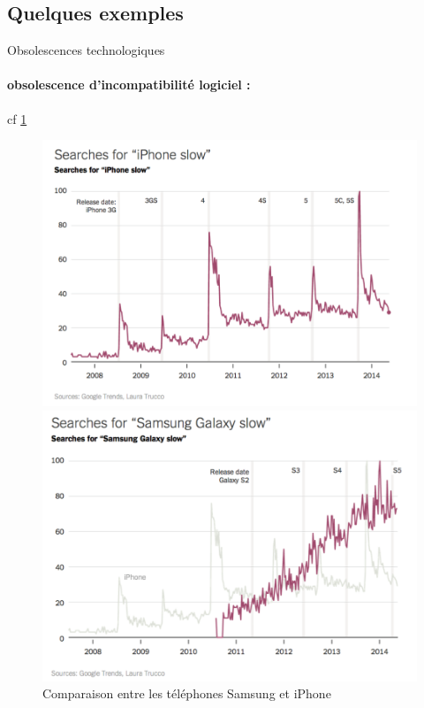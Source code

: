 \subsection{Quelques exemples}


Obsolescences technologiques

\paragraph*{obsolescence d’incompatibilité logiciel :}

cf \ref{compSamsIph}
\begin{figure}[h]

\begin{minipage}{0.5\linewidth}
\includegraphics[scale=0.25]{Rsc/searchForIphoneSlow.png} 
\end{minipage}
\begin{minipage}{0.5\linewidth}
\includegraphics[scale=0.25]{Rsc/searchForSamsungSlow.png} 
\end{minipage}
\caption{Comparaison entre les téléphones Samsung et iPhone}
\label{compSamsIph}
\end{figure}

